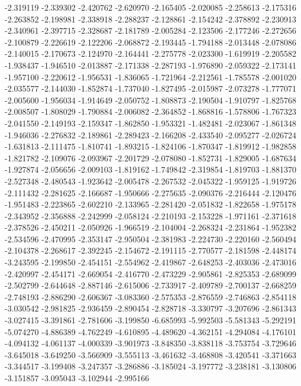 -2.319119
-2.339302
-2.420762
-2.620970
-2.165405
-2.020085
-2.258613
-2.175316
-2.263852
-2.198981
-2.338918
-2.288237
-2.128861
-2.154242
-2.378892
-2.230913
-2.340961
-2.397715
-2.328687
-2.181789
-2.005284
-2.123506
-2.177246
-2.272656
-2.100879
-2.226619
-2.122206
-2.068872
-2.193445
-1.794188
-2.013448
-2.078086
-2.140015
-2.170673
-2.124970
-2.164441
-2.275778
-2.023300
-1.619919
-2.205582
-1.938437
-1.946510
-2.013887
-2.171338
-2.287193
-1.976890
-2.059322
-2.173141
-1.957100
-2.220612
-1.956531
-1.836065
-1.721964
-2.212561
-1.785578
-2.001020
-2.035577
-2.144030
-1.852874
-1.737040
-1.827495
-2.015987
-2.073278
-1.777071
-2.005600
-1.956034
-1.914649
-2.050752
-1.808873
-2.190504
-1.910797
-1.825768
-2.008507
-1.808029
-1.790884
-2.006082
-2.364852
-1.868816
-1.578806
-1.767323
-2.041550
-2.149193
-2.159347
-1.862850
-1.953321
-1.482481
-2.023067
-1.861348
-1.946036
-2.276832
-2.189861
-2.289423
-2.166208
-2.433540
-2.095277
-2.026724
-1.631813
-2.111475
-1.810741
-1.893215
-1.824106
-1.870347
-1.819912
-1.982858
-1.821782
-2.109076
-2.093967
-2.201729
-2.078080
-1.852731
-1.829005
-1.687634
-1.927874
-2.056656
-2.009103
-1.819162
-1.749842
-2.319854
-1.819703
-1.881370
-2.527348
-2.480543
-1.923642
-2.005478
-2.267532
-2.045322
-1.959125
-1.919726
-2.111432
-2.281625
-2.166687
-1.950666
-2.275635
-2.090376
-2.216444
-2.120476
-1.951483
-2.223865
-2.602210
-2.133965
-2.281420
-2.051832
-1.822658
-1.975178
-2.343952
-2.356888
-2.242999
-2.058124
-2.210193
-2.153228
-1.971161
-2.371618
-2.378526
-2.450211
-2.050926
-1.966519
-2.104004
-2.268324
-2.231864
-1.952382
-2.534596
-2.470995
-2.353147
-2.950504
-2.381983
-2.224730
-2.220160
-2.560494
-2.104378
-2.268617
-2.392245
-2.154672
-2.191115
-2.770577
-2.181598
-2.448174
-3.243595
-2.199850
-2.454151
-2.554962
-2.419867
-2.648253
-2.403036
-2.473016
-2.420997
-2.454171
-2.669054
-2.416770
-2.473229
-2.905861
-2.825353
-2.689099
-2.502799
-2.644648
-2.887146
-2.615006
-2.733917
-2.409789
-2.700137
-2.668259
-2.748193
-2.886290
-2.606367
-3.083360
-2.575353
-2.876559
-2.746863
-2.854118
-3.030542
-2.981825
-2.936459
-2.890454
-2.828718
-3.330797
-3.207696
-2.861343
-3.027415
-3.391861
-2.781606
-3.199850
-6.685993
-5.992503
-5.581343
-5.292191
-5.074270
-4.886389
-4.762249
-4.610895
-4.489620
-4.362151
-4.294084
-4.176101
-4.094132
-4.061137
-4.000339
-3.901973
-3.848350
-3.838118
-3.753754
-3.729646
-3.645018
-3.649250
-3.566909
-3.555113
-3.461632
-3.468808
-3.420541
-3.371663
-3.344517
-3.199408
-3.247357
-3.286886
-3.185024
-3.197772
-3.238181
-3.130806
-3.151857
-3.095043
-3.102944
-2.995166

